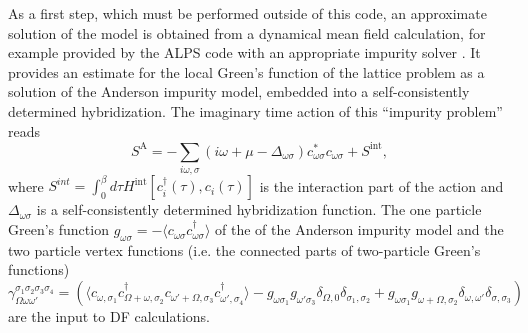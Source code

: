 \documentclass[3p,times,procedia]{elsarticle}
\begin{document}
As a first step, which must be performed outside of this code, an approximate solution of the model is obtained from a dynamical mean field calculation, for example provided by the ALPS code \cite{ALPS2} with an appropriate impurity solver \cite{Hafermann2013a}.
It provides an estimate for the local Green's function of the lattice problem as a  solution of the Anderson impurity model, embedded into a self-consistently determined hybridization. The imaginary time action of this ``impurity problem''  reads  
\begin{equation}
S^{\mathrm{A}} = -\sum_{i\omega,\sigma} (i\omega + \mu - \Delta_{\omega\sigma}) c^*_{\omega\sigma} c_{\omega\sigma} + S^{\mathrm{int}},
\end{equation}
where $S^{int} = \int_0^\beta d\tau H^{\mathrm{int}} [c^\dagger_i(\tau), c_i(\tau)] $ is the interaction part of the action and $\Delta_{\omega\sigma}$ is a self-consistently determined hybridization function. 
The one particle Green's function $g_{\omega\sigma} = -\langle c_{\omega\sigma} c^\dagger_{\omega\sigma} \rangle$ of the of the Anderson impurity model and the two particle vertex functions (i.e. the connected parts of two-particle Green's functions)  
\begin{equation}\label{eqn:vertex}
\gamma_{\Omega\omega\omega'}^{\sigma_1\sigma_2\sigma_3\sigma_4} = \left(\langle c_{\omega,\sigma_1} c^\dagger_{\Omega + \omega,\sigma_2} c_{\omega' + \Omega, \sigma_3} c^\dagger_{\omega', \sigma_4}\rangle - g_{\omega\sigma_1}g_{\omega'\sigma_3}\delta_{\Omega,0}\delta_{\sigma_1,\sigma_2} + g_{\omega\sigma_1} g_{\omega + \Omega, \sigma_2} \delta_{\omega,\omega'}\delta_{\sigma, \sigma_3} \right)
\end{equation}
are the input to DF calculations. 
\end{document}
